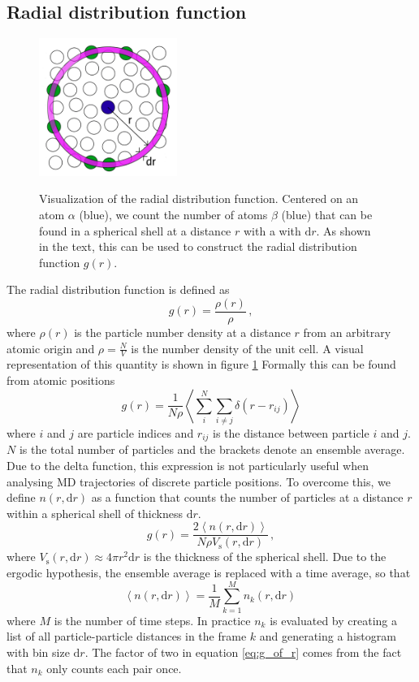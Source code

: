 \subsection{Radial distribution function}

\begin{figure}
	\centering
	\includegraphics[width=0.4\textwidth]{fig/temp/gr.png}
	\label{fig:rdf}
	\caption[RDF visualization]{Visualization of the radial distribution function. Centered on an atom $\alpha$ (blue), we count the number of atoms $\beta$ (blue) that can be found in a spherical shell at a distance $r$ with a with $\mathrm{d}r$. As shown in the text, this can be used to construct the radial distribution function $g(r)$.}
\end{figure}

The radial distribution function is defined as
%
\[ g(r) = \frac{\rho(r)}{\rho} \, , \]
%
where $\rho(r)$ is the particle number density at a distance $r$ from an arbitrary atomic origin and $\rho = \frac{N}{V}$ is the number density of the unit cell. A visual representation of this quantity is shown in figure \ref{fig:rdf} Formally this can be found from atomic positions
%
\[ g(r) = \frac{1}{N\rho} \left\langle \sum_i^N \sum_{i \neq j} \delta(r - r_{ij})  \right\rangle \]
%
where $i$ and $j$ are particle indices and $r_{ij}$ is the distance between particle $i$ and $j$. $N$ is the total number of particles and the brackets denote an ensemble average. Due to the delta function, this expression is not particularly useful when analysing MD trajectories of discrete particle positions. To overcome this, we define $n(r,\mathrm{d}r)$ as a function that counts the number of particles at a distance $r$ within a spherical shell of thickness $\mathrm{d}r$.
%
\begin{equation}\label{eq:g_of_r}
g(r) = \frac{2 \left\langle n(r,\mathrm{d}r) \right\rangle}{N \rho V_\text{s}(r,\mathrm{d}r)} \, ,
\end{equation}
%
where $V_\text{s}(r,\mathrm{d}r) \approx 4 \pi r^2 \mathrm{d}r$ is the thickness of the spherical shell. Due to the ergodic hypothesis, the ensemble average is replaced with a time average, so that 
%
\[ \left\langle n(r,\mathrm{d}r) \right\rangle = \frac{1}{M} \sum_{k=1}^M n_k(r,\mathrm{d}r) \, \]
%
where $M$ is the number of time steps. In practice $n_k$ is evaluated by creating a list of all particle-particle distances in the frame $k$ and generating a histogram with bin size $\mathrm{d}r$. The factor of two in equation \eqref{eq:g_of_r} comes from the fact that $n_k$ only counts each pair once.

